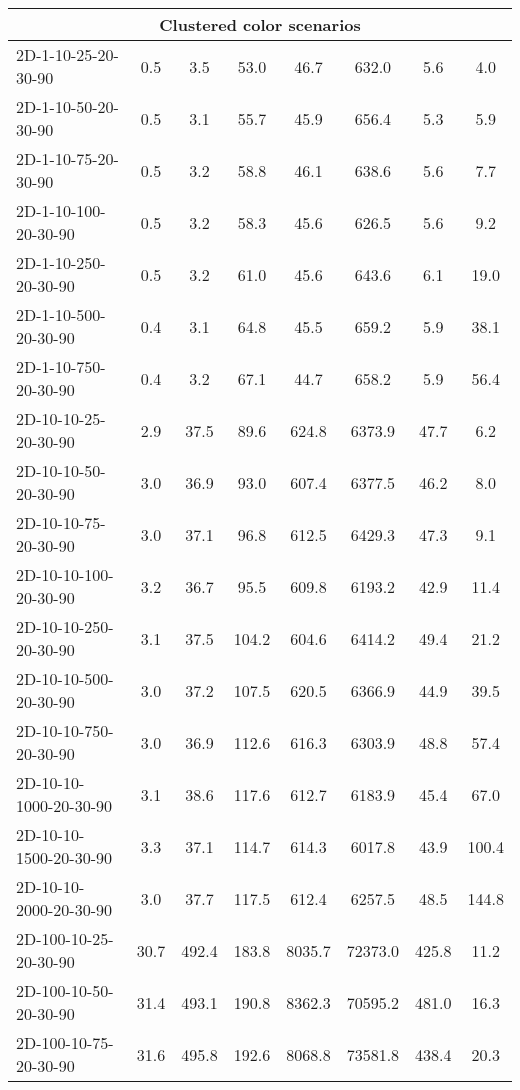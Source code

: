 \documentclass{article}
\begin{document}
\begin{center}
\begin{table}[h]
\begin{tabular}{|l||c|c|c|c|c|c|c|}
        \hline
        \hline
        \multicolumn{8}{|c|}{Clustered color scenarios} \\
        \hline
        2D-1-10-25-20-30-90 & 0.5 & 3.5 & 53.0 & 46.7 & 632.0 & 5.6 & 4.0 \\
        2D-1-10-50-20-30-90 & 0.5 & 3.1 & 55.7 & 45.9 & 656.4 & 5.3 & 5.9 \\
        2D-1-10-75-20-30-90 & 0.5 & 3.2 & 58.8 & 46.1 & 638.6 & 5.6 & 7.7 \\
        2D-1-10-100-20-30-90 & 0.5 & 3.2 & 58.3 & 45.6 & 626.5 & 5.6 & 9.2 \\
        2D-1-10-250-20-30-90 & 0.5 & 3.2 & 61.0 & 45.6 & 643.6 & 6.1 & 19.0 \\
        2D-1-10-500-20-30-90 & 0.4 & 3.1 & 64.8 & 45.5 & 659.2 & 5.9 & 38.1 \\
        2D-1-10-750-20-30-90 & 0.4 & 3.2 & 67.1 & 44.7 & 658.2 & 5.9 & 56.4 \\
        \hline
        2D-10-10-25-20-30-90 & 2.9 & 37.5 & 89.6 & 624.8 & 6373.9 & 47.7 & 6.2 \\
        2D-10-10-50-20-30-90 & 3.0 & 36.9 & 93.0 & 607.4 & 6377.5 & 46.2 & 8.0 \\
        2D-10-10-75-20-30-90 & 3.0 & 37.1 & 96.8 & 612.5 & 6429.3 & 47.3 & 9.1 \\
        2D-10-10-100-20-30-90 & 3.2 & 36.7 & 95.5 & 609.8 & 6193.2 & 42.9 & 11.4 \\
        2D-10-10-250-20-30-90 & 3.1 & 37.5 & 104.2 & 604.6 & 6414.2 & 49.4 & 21.2 \\
        2D-10-10-500-20-30-90 & 3.0 & 37.2 & 107.5 & 620.5 & 6366.9 & 44.9 & 39.5 \\
        2D-10-10-750-20-30-90 & 3.0 & 36.9 & 112.6 & 616.3 & 6303.9 & 48.8 & 57.4 \\
        2D-10-10-1000-20-30-90 & 3.1 & 38.6 & 117.6 & 612.7 & 6183.9 & 45.4 & 67.0 \\
        2D-10-10-1500-20-30-90 & 3.3 & 37.1 & 114.7 & 614.3 & 6017.8 & 43.9 & 100.4 \\
        2D-10-10-2000-20-30-90 & 3.0 & 37.7 & 117.5 & 612.4 & 6257.5 & 48.5 & 144.8 \\
        \hline
        2D-100-10-25-20-30-90 & 30.7 & 492.4 & 183.8 & 8035.7 & 72373.0 & 425.8 & 11.2 \\
        2D-100-10-50-20-30-90 & 31.4 & 493.1 & 190.8 & 8362.3 & 70595.2 & 481.0 & 16.3 \\
        2D-100-10-75-20-30-90 & 31.6 & 495.8 & 192.6 & 8068.8 & 73581.8 & 438.4 & 20.3 \\

\end{tabular}
\end{table}
\end{center}
\end{document}
